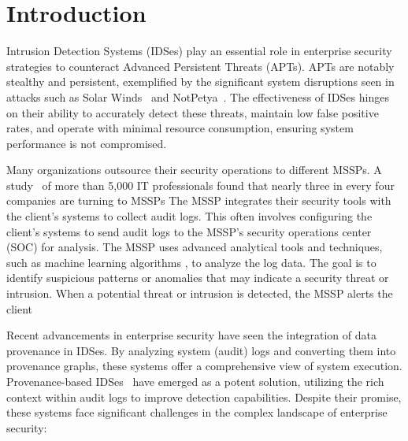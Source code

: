 \section{Introduction}
\label{s:intro}

Intrusion Detection Systems (IDSes) play an essential role in enterprise security strategies to counteract Advanced Persistent Threats (APTs). APTs are notably stealthy and persistent, exemplified by the significant system disruptions seen in attacks such as Solar Winds~\cite{solarwinds} and NotPetya~\cite{notpetya}. The effectiveness of IDSes hinges on their ability to accurately detect these threats, maintain low false positive rates, and operate with minimal resource consumption, ensuring system performance is not compromised.

Many organizations outsource their security operations to different MSSPs. A study~\cite{msspsurvey}  of more than 5,000 IT professionals found that nearly three in every four companies are turning to MSSPs The MSSP integrates their security tools with the client's systems to collect audit logs. This often involves configuring the client’s systems to send audit logs to the MSSP's security operations center (SOC) for analysis. The MSSP uses advanced analytical tools and techniques, such as machine learning algorithms , to analyze the log data. The goal is to identify suspicious patterns or anomalies that may indicate a security threat or intrusion. When a potential threat or intrusion is detected, the MSSP alerts the client 


Recent advancements in enterprise security have seen the integration of data provenance in IDSes. By analyzing system (audit) logs and converting them into provenance graphs, these systems offer a comprehensive view of system execution. Provenance-based IDSes~\cite{streamspot,provdetector2020,wang2022threatrace,shadewatcher,yangprographer,han2020unicorn} have emerged as a potent solution, utilizing the rich context within audit logs to improve detection capabilities. Despite their promise, these systems face significant challenges in the complex landscape of enterprise security:

